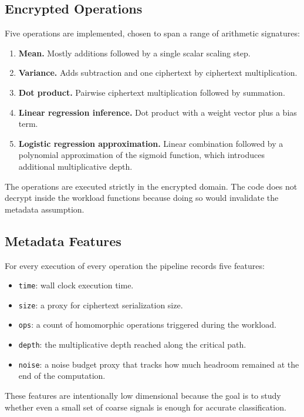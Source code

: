 \documentclass[12pt,a4paper]{article}
\begin{document}
\subsection{Encrypted Operations}
Five operations are implemented, chosen to span a range of arithmetic signatures:
\begin{enumerate}[leftmargin=*]
  \item \textbf{Mean.} Mostly additions followed by a single scalar scaling step.
  \item \textbf{Variance.} Adds subtraction and one ciphertext by ciphertext multiplication.
  \item \textbf{Dot product.} Pairwise ciphertext multiplication followed by summation.
  \item \textbf{Linear regression inference.} Dot product with a weight vector plus a bias term.
  \item \textbf{Logistic regression approximation.} Linear combination followed by a polynomial approximation of the sigmoid function, which introduces additional multiplicative depth.
\end{enumerate}
The operations are executed strictly in the encrypted domain. The code does not decrypt inside the workload functions because doing so would invalidate the metadata assumption.

\subsection{Metadata Features}
For every execution of every operation the pipeline records five features:
\begin{itemize}[leftmargin=*]
  \item \texttt{time}: wall clock execution time.
  \item \texttt{size}: a proxy for ciphertext serialization size.
  \item \texttt{ops}: a count of homomorphic operations triggered during the workload.
  \item \texttt{depth}: the multiplicative depth reached along the critical path.
  \item \texttt{noise}: a noise budget proxy that tracks how much headroom remained at the end of the computation.
\end{itemize}
These features are intentionally low dimensional because the goal is to study whether even a small set of coarse signals is enough for accurate classification.
\end{document}
